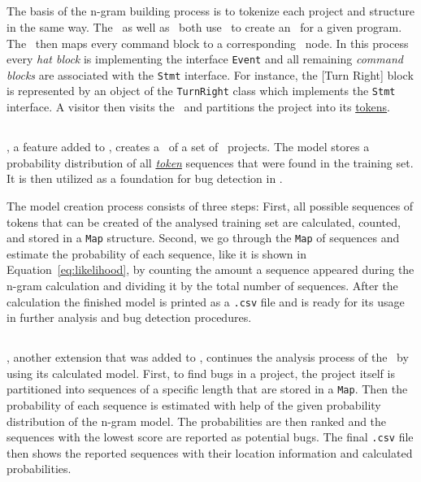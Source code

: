 \subsection{\tokenizer{}}\label{subsec:tokenizer}
The basis of the n-gram building process is to tokenize each project and structure in the same way. The \ngramtrainer\ as well as \ngrambugfinder\ both use \litterbox\ to create an \AST\ for a given program. The \AST\ then maps every command block to a corresponding \AST\ node. In this process every \textit{hat block} is implementing the interface \texttt{Event} and all remaining \textit{command blocks} are associated with the \texttt{Stmt} interface. For instance, the [Turn Right] block is represented by an object of the \texttt{TurnRight} class which implements the \texttt{Stmt} interface. A visitor then visits the \AST\ and partitions the project into its \hyperref[def:token]{tokens}.

\subsection{\ngramtrainer{}}\label{subsec:ngramtrainer}
\ngramtrainer, a feature added to \litterbox, creates a \ngram\ of a set of \scratch\ projects. The model stores a probability distribution of all \hyperref[def:token]{\textit{token}} sequences that were found in the training set. It is then utilized as a foundation for bug detection in \scratch.

The model creation process consists of three steps: First, all possible sequences of tokens that can be created of the analysed training set are calculated, counted, and stored in a \texttt{Map} structure. Second, we go through the \texttt{Map} of sequences and estimate the probability of each sequence, like it is shown in Equation~\ref{eq:likelihood}, by counting the amount a sequence appeared during the n-gram calculation and dividing it by the total number of sequences. After the calculation the finished model is printed as a \texttt{.csv} file and is ready for its usage in further analysis and bug detection procedures.

\subsection{\ngrambugfinder{}}\label{subsec:ngrambugfinder}
\ngrambugfinder, another extension that was added to \litterbox, continues the analysis process of the \ngramtrainer\ by using its calculated model. First, to find bugs in a project, the project itself is partitioned into sequences of a specific length that are stored in a \texttt{Map}. Then the probability of each sequence is estimated with help of the given probability distribution of the n-gram model. The probabilities are then ranked and the sequences with the lowest score are reported as potential bugs. The final \texttt{.csv} file then shows the reported sequences with their location information and calculated probabilities.